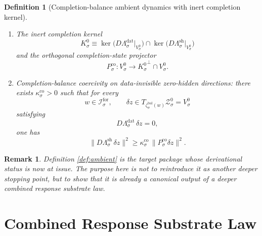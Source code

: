 \documentclass[11pt]{article}
\newcommand{\ForSpace}[1]{\mathcal I_{#1}^{\mathrm{for}}}
\newcommand{\BalBody}[1]{\mathcal B_{#1}^{\mathrm{bal}}}
\newcommand{\BalData}[1]{\Lambda_{#1}^{\mathrm{dat}}}
\newcommand{\BalShell}[1]{\Lambda_{#1}^{\mathrm{sh}}}
\newcommand{\ZeroHiddenSlice}[1]{\mathcal Z_{#1}^{0}}
\newcommand{\ZeroHiddenVec}[1]{V_{#1}^{0}}
\newcommand{\Kernel}[1]{K_{#1}^{0}}
\newcommand{\BalEmbed}[1]{\zeta_{#1}^{\mathrm{bal}}}
\newcommand{\StateComp}[1]{P_{#1}^{\mathrm{co}}}
\newtheorem{definition}{Definition}
\newtheorem{remark}{Remark}
\begin{document}
\begin{definition}[Completion-balance ambient dynamics with inert completion kernel]
\begin{enumerate}
\begin{equation}
    \BalBody{\sigma}\cap\ZeroHiddenSlice{\sigma}
    \bigr)
    =
    \BalData{\sigma}\Bigl(
    \BalBody{\sigma}\cap
    \ZeroHiddenSlice{\sigma}\cap
    \bigl(\BalShell{\sigma}\bigr)^{-1}(0)
    \Bigr).
    \label{eq:ambientsolvability}
    \end{equation}
    \item The inert completion kernel
    \[
    \Kernel{\sigma}
    \equiv
    \ker\bigl(D\BalData{\sigma}\big|_{\ZeroHiddenVec{\sigma}}\bigr)
    \cap
    \ker\bigl(D\BalShell{\sigma}\big|_{\ZeroHiddenVec{\sigma}}\bigr)
    \]
    and the orthogonal completion-state projector
    \[
    \StateComp{\sigma}:\ZeroHiddenVec{\sigma}\to{\Kernel{\sigma}}^{\perp}\cap\ZeroHiddenVec{\sigma}.
    \]
    \item Completion-balance coercivity on data-invisible zero-hidden directions: there exists \(\kappa_{\sigma}^{\mathrm{co}}>0\) such that for every
    \[
    w\in\ForSpace{\sigma},
    \qquad
    \delta z\in T_{\BalEmbed{\sigma}(w)}\ZeroHiddenSlice{\sigma}=\ZeroHiddenVec{\sigma}
    \]
    satisfying
    \[
    D\BalData{\sigma}\,\delta z=0,
    \]
    one has
    \begin{equation}
    \|D\BalShell{\sigma}\,\delta z\|^{2}
    \ge
    \kappa_{\sigma}^{\mathrm{co}}\,
    \|\StateComp{\sigma}\delta z\|^{2}.
    \label{eq:ambientcoercive}
    \end{equation}
\end{enumerate}
\end{definition}

\begin{remark}
Definition \ref{def:ambient} is the target package whose derivational status is now at issue. The purpose here is not to reintroduce it as another deeper stopping point, but to show that it is already a canonical output of a deeper combined response substrate law.
\end{remark}

\section{Combined Response Substrate Law}
\end{document}
